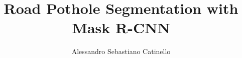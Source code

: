 \documentclass[12pt,a4paper,openany,oneside]{book}
\begin{document}


\title{Road Pothole Segmentation with Mask R-CNN}
\author{Alessandro Sebastiano Catinello}



\tableofcontents






\newpage
{}

\end{document}
